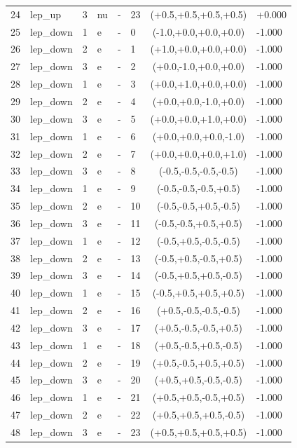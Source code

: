 \begin{longtable}{rlllllcl}
24 & lep\_up & 3 & nu & - & 23 & (+0.5,+0.5,+0.5,+0.5) & +0.000 \\
25 & lep\_down & 1 & e & - & 0 & (-1.0,+0.0,+0.0,+0.0) & -1.000 \\
26 & lep\_down & 2 & e & - & 1 & (+1.0,+0.0,+0.0,+0.0) & -1.000 \\
27 & lep\_down & 3 & e & - & 2 & (+0.0,-1.0,+0.0,+0.0) & -1.000 \\
28 & lep\_down & 1 & e & - & 3 & (+0.0,+1.0,+0.0,+0.0) & -1.000 \\
29 & lep\_down & 2 & e & - & 4 & (+0.0,+0.0,-1.0,+0.0) & -1.000 \\
30 & lep\_down & 3 & e & - & 5 & (+0.0,+0.0,+1.0,+0.0) & -1.000 \\
31 & lep\_down & 1 & e & - & 6 & (+0.0,+0.0,+0.0,-1.0) & -1.000 \\
32 & lep\_down & 2 & e & - & 7 & (+0.0,+0.0,+0.0,+1.0) & -1.000 \\
33 & lep\_down & 3 & e & - & 8 & (-0.5,-0.5,-0.5,-0.5) & -1.000 \\
34 & lep\_down & 1 & e & - & 9 & (-0.5,-0.5,-0.5,+0.5) & -1.000 \\
35 & lep\_down & 2 & e & - & 10 & (-0.5,-0.5,+0.5,-0.5) & -1.000 \\
36 & lep\_down & 3 & e & - & 11 & (-0.5,-0.5,+0.5,+0.5) & -1.000 \\
37 & lep\_down & 1 & e & - & 12 & (-0.5,+0.5,-0.5,-0.5) & -1.000 \\
38 & lep\_down & 2 & e & - & 13 & (-0.5,+0.5,-0.5,+0.5) & -1.000 \\
39 & lep\_down & 3 & e & - & 14 & (-0.5,+0.5,+0.5,-0.5) & -1.000 \\
40 & lep\_down & 1 & e & - & 15 & (-0.5,+0.5,+0.5,+0.5) & -1.000 \\
41 & lep\_down & 2 & e & - & 16 & (+0.5,-0.5,-0.5,-0.5) & -1.000 \\
42 & lep\_down & 3 & e & - & 17 & (+0.5,-0.5,-0.5,+0.5) & -1.000 \\
43 & lep\_down & 1 & e & - & 18 & (+0.5,-0.5,+0.5,-0.5) & -1.000 \\
44 & lep\_down & 2 & e & - & 19 & (+0.5,-0.5,+0.5,+0.5) & -1.000 \\
45 & lep\_down & 3 & e & - & 20 & (+0.5,+0.5,-0.5,-0.5) & -1.000 \\
46 & lep\_down & 1 & e & - & 21 & (+0.5,+0.5,-0.5,+0.5) & -1.000 \\
47 & lep\_down & 2 & e & - & 22 & (+0.5,+0.5,+0.5,-0.5) & -1.000 \\
48 & lep\_down & 3 & e & - & 23 & (+0.5,+0.5,+0.5,+0.5) & -1.000 \\

\end{longtable}

